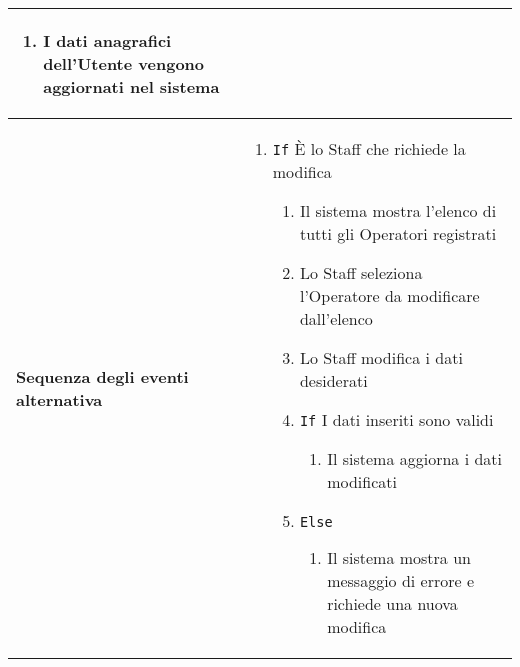 \documentclass[a4paper]{report}
\begin{document}
\begin{table}[H]
\begin{tabular}{|p{3.9cm}|p{9.9cm}|}
\begin{enumerate}[leftmargin=14pt,label=\arabic*.,labelsep=0.5em,topsep=0pt,partopsep=0pt,parsep=0pt,itemsep=0pt]
    \item I dati anagrafici dell’Utente vengono aggiornati nel sistema
    \end{enumerate} \\ \hline
\textbf{Sequenza degli eventi alternativa} & \begin{enumerate}[leftmargin=14pt,label=\arabic*.,labelsep=0.5em,topsep=0pt,partopsep=0pt,parsep=0pt,itemsep=0pt] 
    \item \texttt{If} È lo Staff che richiede la modifica
    \begin{enumerate}[label=\arabic{enumi}.\arabic*.,leftmargin=22pt,labelsep=0.5em,topsep=0pt,partopsep=0pt,parsep=0pt,itemsep=0pt]
    \item Il sistema mostra l'elenco di tutti gli Operatori registrati
    \item Lo Staff seleziona l'Operatore da modificare dall'elenco
    \item Lo Staff modifica i dati desiderati
    \item \texttt{If} I dati inseriti sono validi
    \begin{enumerate}[label=\arabic{enumi}.\arabic{enumii}.\arabic*.,leftmargin=22pt,labelsep=0.5em,topsep=0pt,partopsep=0pt,parsep=0pt,itemsep=0pt]
        \item Il sistema aggiorna i dati modificati
        \end{enumerate}
    \item \texttt{Else}
    \begin{enumerate}[label=\arabic{enumi}.\arabic{enumii}.\arabic*.,leftmargin=22pt,labelsep=0.5em,topsep=0pt,partopsep=0pt,parsep=0pt,itemsep=0pt]
        \item Il sistema mostra un messaggio di errore e richiede una nuova modifica
        \end{enumerate}
    \end{enumerate}
\end{enumerate}\\ \hline
\end{tabular}
\end{table}
\end{document}
